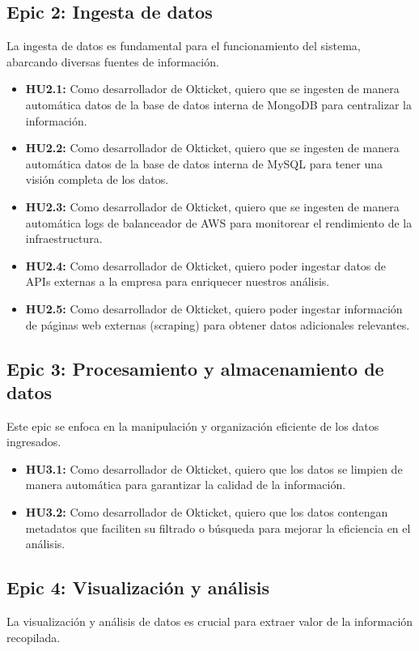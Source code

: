 \subsection{Epic 2: Ingesta de datos}
La ingesta de datos es fundamental para el funcionamiento del sistema,
abarcando diversas fuentes de información.

\begin{itemize}
    \item \textbf{HU2.1:} Como desarrollador de Okticket, quiero que se
    ingesten de manera automática datos de la base de datos interna de MongoDB
    para centralizar la información.
    \item \textbf{HU2.2:} Como desarrollador de Okticket, quiero que se
    ingesten de manera automática datos de la base de datos interna de MySQL
    para tener una visión completa de los datos.
    \item \textbf{HU2.3:} Como desarrollador de Okticket, quiero que se
    ingesten de manera automática logs de balanceador de AWS para monitorear
    el rendimiento de la infraestructura.
    \item \textbf{HU2.4:} Como desarrollador de Okticket, quiero poder ingestar
    datos de APIs externas a la empresa para enriquecer nuestros análisis.
    \item \textbf{HU2.5:} Como desarrollador de Okticket, quiero poder ingestar
    información de páginas web externas (scraping) para obtener datos
    adicionales relevantes.
\end{itemize}

\newpage{}
\subsection{Epic 3: Procesamiento y almacenamiento de datos}
Este epic se enfoca en la manipulación y organización eficiente de los datos
ingresados.

\begin{itemize}
    \item \textbf{HU3.1:} Como desarrollador de Okticket, quiero que los datos
    se limpien de manera automática para garantizar la calidad de la
    información.
    \item \textbf{HU3.2:} Como desarrollador de Okticket, quiero que los datos
    contengan metadatos que faciliten su filtrado o búsqueda para mejorar la
    eficiencia en el análisis.
\end{itemize}

\subsection{Epic 4: Visualización y análisis}
La visualización y análisis de datos es crucial para extraer valor de la
información recopilada.

